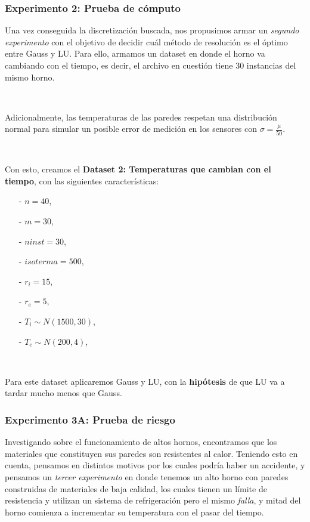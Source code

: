 \subsubsection{Experimento 2: Prueba de cómputo}

Una vez conseguida la discretización buscada, nos propusimos armar un \emph{segundo experimento} con el objetivo de decidir cuál método de resolución es el óptimo entre Gauss y LU. Para ello, armamos un dataset en donde el horno va cambiando con el tiempo, es decir, el archivo en cuestión tiene 30 instancias del mismo horno. 

\

Adicionalmente, las temperaturas de las paredes respetan una distribución normal para simular un posible error de medición en los sensores con $\sigma = \frac{\mu}{50}$. 

\

Con esto, creamos el \textbf{Dataset 2: Temperaturas que cambian con el tiempo}, con las siguientes características:

\begin{itemize}
    \item[-] $n = 40$,
    \item[-] $m = 30$,
    \item[-] $ninst = 30$,
    \item[-] $isoterma = 500$,
    \item[-] $r_i = 15$,
    \item[-] $r_e = 5$,
    \item[-] $T_i \sim N(1500, 30)$,
    \item[-] $T_e \sim N(200, 4)$,
\end{itemize}

\

Para este dataset aplicaremos Gauss y LU, con la \textbf{hipótesis} de que LU va a tardar mucho menos que Gauss.

\subsubsection{Experimento 3A: Prueba de riesgo}

Investigando sobre el funcionamiento de altos hornos, encontramos que los materiales que constituyen sus paredes son resistentes al calor. Teniendo esto en cuenta, pensamos en distintos motivos por los cuales podría haber un accidente, y pensamos un \emph{tercer experimento} en donde tenemos un alto horno con paredes construidas de materiales de baja calidad, los cuales tienen un límite de resistencia y utilizan un sistema de refrigeración pero el mismo \emph{falla}, y mitad del horno comienza a incrementar su temperatura con el pasar del tiempo.

